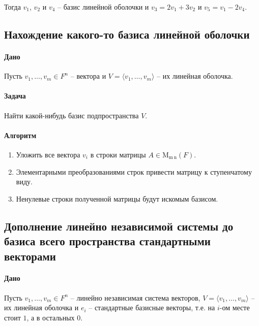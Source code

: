 \documentclass{article}
\newcommand{\MatrixDim}[3]{\operatorname{\mathrm{M}_{#2\,#3}}(#1)}
\begin{document}
Тогда $v_1$, $v_2$ и $v_4$ -- базис линейной оболочки и $v_3 = 2v_1 + 3 v_2$ и $v_5 = v_1 - 2 v_4$.

\subsection{Нахождение какого-то базиса линейной оболочки}

\paragraph{Дано}

Пусть $v_1,\ldots,v_m\in F^n$ -- вектора и $V = \langle v_1,\ldots,v_m\rangle$ -- их линейная оболочка.

\paragraph{Задача}

Найти какой-нибудь базис подпространства $V$.

\paragraph{Алгоритм}

\begin{enumerate}
\item Уложить все вектора $v_i$ в строки матрицы $A\in \MatrixDim{F}{m}{n}$.

\item Элементарными преобразованиями строк привести матрицу к ступенчатому виду.

\item Ненулевые строки полученной матрицы будут искомым базисом.
\end{enumerate}

\subsection{Дополнение линейно независимой системы до базиса всего пространства стандартными векторами}

\paragraph{Дано}

Пусть $v_1,\ldots,v_m\in F^{n}$ -- линейно независимая система векторов, $V = \langle v_1,\ldots,v_m \rangle$ -- их линейная оболочка и $e_i$ -- стандартные базисные векторы, т.е. на $i$-ом месте стоит $1$, а в остальных $0$.
\end{document}
